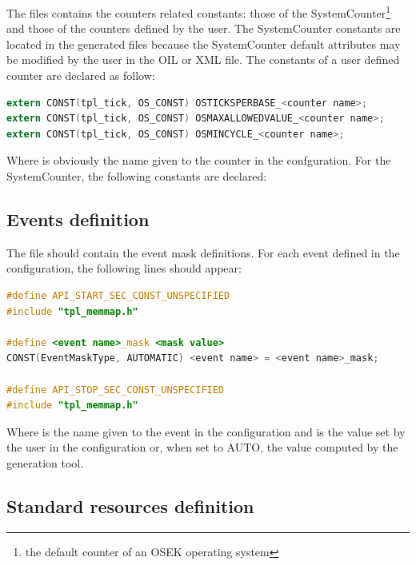 The  files contains the counters related constants: those of the SystemCounter\footnote{the default counter of an OSEK operating system} and those of the counters defined by the user. The SystemCounter constants are located in the generated files because the SystemCounter default attributes may be modified by the user in the OIL or XML file. The constants of a user defined counter are declared as follow:

\begin{lstlisting}[language=C]
extern CONST(tpl_tick, OS_CONST) OSTICKSPERBASE_<counter name>;
extern CONST(tpl_tick, OS_CONST) OSMAXALLOWEDVALUE_<counter name>;
extern CONST(tpl_tick, OS_CONST) OSMINCYCLE_<counter name>;
\end{lstlisting}

Where  is obviously the name given to the counter in the confguration. For the SystemCounter, the following constants are declared:


\subsection{Events definition}

The  file should contain the event mask definitions. For each event defined in the configuration, the following lines should appear:

\begin{lstlisting}[language=C]
#define API_START_SEC_CONST_UNSPECIFIED
#include "tpl_memmap.h"

#define <event name>_mask <mask value>
CONST(EventMaskType, AUTOMATIC) <event name> = <event name>_mask;

#define API_STOP_SEC_CONST_UNSPECIFIED
#include "tpl_memmap.h"
\end{lstlisting}

Where  is the name given to the event in the configuration and  is the value set by the user in the configuration or, when set to AUTO, the value computed by the generation tool.

\subsection{Standard resources definition}

